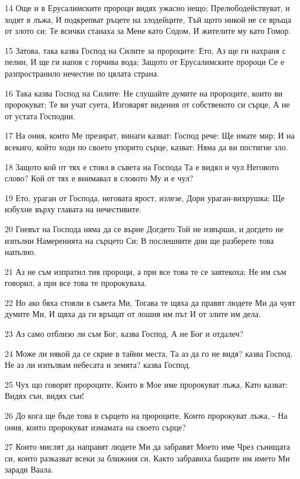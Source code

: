 \par 14 Още и в Ерусалимските пророци видях ужасно нещо; Прелюбодействуват, и ходят в лъжа, И подкрепват ръцете на злодейците, Тъй щото никой не се връща от злото си; Те всички станаха за Мене като Содом, И жителите му като Гомор.
\par 15 Затова, така казва Господ на Силите за пророците: Ето, Аз ще ги нахраня с пелин, И ще ги напоя с горчива вода; Защото от Ерусалимските пророци Се е разпространило нечестие по цялата страна.
\par 16 Така казва Господ на Силите: Не слушайте думите на пророците, които ви пророкуват; Те ви учат суета, Изговарят видения от собственото си сърце, А не от устата Господни.
\par 17 На ония, които Ме презират, винаги казват: Господ рече: Ще имате мир; И на всекиго, който ходи по своето упорито сърце, казват: Няма да ви постигне зло.
\par 18 Защото кой от тях е стоял в съвета на Господа Та е видял и чул Неговото слово? Кой от тях е внимавал в словото Му и е чул?
\par 19 Ето, ураган от Господа, неговата ярост, излезе, Дори ураган-вихрушка; Ще избухне върху главата на нечестивите.
\par 20 Гневът на Господа няма да се върне Догдето Той не извърши, и догдето не изпълни Намеренията на сърцето Си; В послешните дни ще разберете това напълно.
\par 21 Аз не съм изпратил тия пророци, а при все това те се завтекоха; Не им съм говорил, а при все това те пророкуваха.
\par 22 Но ако бяха стояли в съвета Ми, Тогава те щяха да правят людете Ми да чуят думите Ми, И щяха да ги връщат от лошия им път И от злите им дела.
\par 23 Аз само отблизо ли съм Бог, казва Господ, А не Бог и отдалеч?
\par 24 Може ли някой да се скрие в тайни места, Та аз да го не видя? казва Господ. Не аз ли изпълвам небесата и земята? казва Господ.
\par 25 Чух що говорят пророците, Които в Мое име пророкуват лъжа, Като казват: Видях сън, видях сън!
\par 26 До кога ще бъде това в сърцето на пророците, Които пророкуват лъжа, - На ония, които пророкуват измамата на своето сърце?
\par 27 Които мислят да направят людете Ми да забравят Моето име Чрез сънищата си, които разказват всеки за ближния си, Както забравиха бащите им името Ми заради Ваала.
